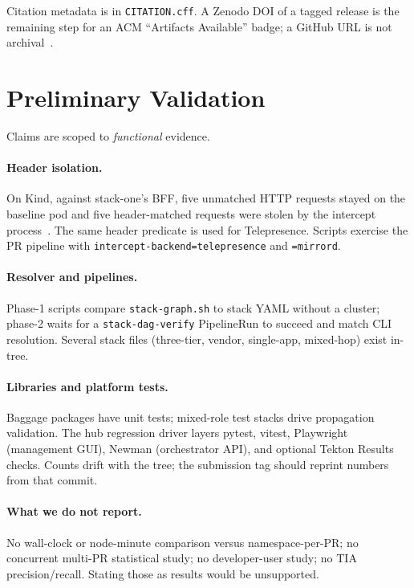 \documentclass[10pt,conference]{IEEEtran}
\begin{document}
Citation metadata is in \texttt{CITATION.cff}. A Zenodo DOI of a tagged release is the remaining step for an ACM ``Artifacts Available'' badge; a GitHub URL is not archival~\cite{acmbadges}.

\section{Preliminary Validation}
\label{sec:eval}

Claims are scoped to \emph{functional} evidence.

\paragraph{Header isolation.}
On Kind, against stack-one's BFF, five unmatched HTTP requests stayed on the baseline pod and five header-matched requests were stolen by the intercept process~\cite{mirrordpoc}. The same header predicate is used for Telepresence. Scripts exercise the PR pipeline with \texttt{intercept-backend=telepresence} and \texttt{=mirrord}.

\paragraph{Resolver and pipelines.}
Phase-1 scripts compare \texttt{stack-graph.sh} to stack YAML without a cluster; phase-2 waits for a \texttt{stack-dag-verify} PipelineRun to succeed and match CLI resolution. Several stack files (three-tier, vendor, single-app, mixed-hop) exist in-tree.

\paragraph{Libraries and platform tests.}
Baggage packages have unit tests; mixed-role test stacks drive propagation validation. The hub regression driver layers pytest, vitest, Playwright (management GUI), Newman (orchestrator API), and optional Tekton Results checks. Counts drift with the tree; the submission tag should reprint numbers from that commit.

\paragraph{What we do not report.}
No wall-clock or node-minute comparison versus namespace-per-PR; no concurrent multi-PR statistical study; no developer-user study; no TIA precision/recall. Stating those as results would be unsupported.
\end{document}
